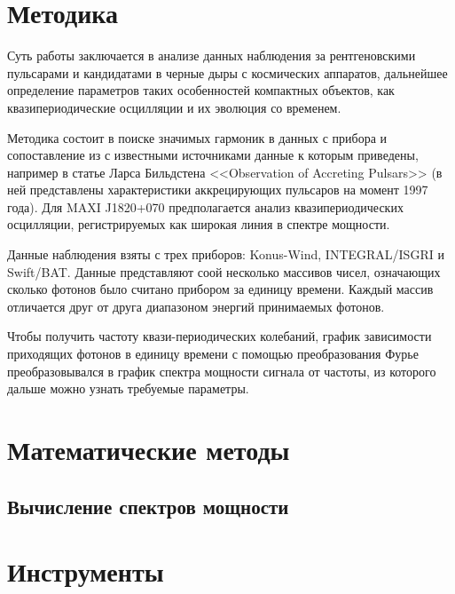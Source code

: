 \section{Методика}

	Суть работы заключается в анализе данных наблюдения за рентгеновскими пульсарами и кандидатами в черные дыры с космических аппаратов, дальнейшее определение параметров таких особенностей компактных объектов, как квазипериодические осцилляции и их эволюция со временем.

	Методика состоит в поиске значимых гармоник в данных с прибора и сопоставление из с известными источниками данные к которым приведены, например в статье Ларса Бильдстена <<Observation of Accreting Pulsars>> (в ней представлены характеристики аккрецирующих пульсаров на момент 1997 года). Для MAXI J1820+070 предполагается анализ квазипериодических осцилляции, регистрируемых как широкая линия в спектре мощности.
	
	Данные наблюдения взяты с трех приборов: Konus-Wind, INTEGRAL/ISGRI и Swift/BAT. Данные представляют соой несколько массивов чисел, означающих сколько фотонов было считано прибором за единицу времени. Каждый массив отличается друг от друга диапазоном энергий принимаемых фотонов.
	
	Чтобы получить частоту квази-периодических колебаний, график зависимости приходящих фотонов в единицу времени с помощью преобразования Фурье преобразовывался в график спектра мощности сигнала от частоты, из которого дальше можно узнать требуемые параметры.
	
\section{Математические методы}
	
	\subsection{Вычисление спектров мощности}
		
		

\section{Инструменты}
	
